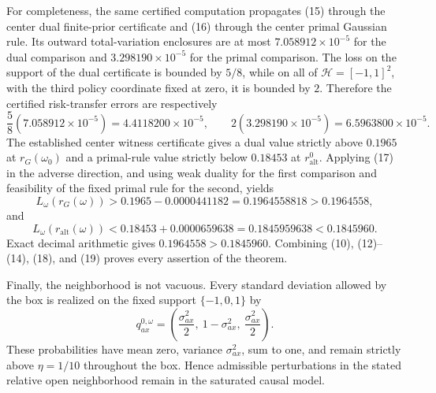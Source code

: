 For completeness, the same certified computation propagates (15) through the center dual finite-prior certificate and (16) through the center primal Gaussian rule.  Its outward total-variation enclosures are at most \(7.058912\times10^{-5}\) for the dual comparison and \(3.298190\times10^{-5}\) for the primal comparison.  The loss on the support of the dual certificate is bounded by \(5/8\), while on all of \(\mathcal H=[-1,1]^2\), with the third policy coordinate fixed at zero, it is bounded by \(2\).  Therefore the certified risk-transfer errors are respectively
\[
 \frac58(7.058912\times10^{-5})=4.4118200\times10^{-5},
 \qquad
 2(3.298190\times10^{-5})=6.5963800\times10^{-5}.
 \tag{17}
\]
The established center witness certificate gives a dual value strictly above \(0.1965\) at \(r_G(\omega_0)\) and a primal-rule value strictly below \(0.18453\) at \(r_{\mathrm{alt}}^0\).  Applying (17) in the adverse direction, and using weak duality for the first comparison and feasibility of the fixed primal rule for the second, yields
\[
 L_\omega(r_G(\omega))
 >0.1965-0.0000441182
 =0.1964558818
 >0.1964558,
 \tag{18}
\]
and
\[
 L_\omega(r_{\mathrm{alt}}(\omega))
 <0.18453+0.0000659638
 =0.1845959638
 <0.1845960.
 \tag{19}
\]
Exact decimal arithmetic gives \(0.1964558>0.1845960\).  Combining (10), (12)--(14), (18), and (19) proves every assertion of the theorem.

Finally, the neighborhood is not vacuous.  Every standard deviation allowed by the box is realized on the fixed support \(\{-1,0,1\}\) by
\[
 q_{ax}^{0,\omega}
 =\left(\frac{\sigma_{ax}^2}{2},\ 1-\sigma_{ax}^2,\
 \frac{\sigma_{ax}^2}{2}\right).
\]
These probabilities have mean zero, variance \(\sigma_{ax}^2\), sum to one, and remain strictly above \(\eta=1/10\) throughout the box.  Hence admissible perturbations in the stated relative open neighborhood remain in the saturated causal model.
